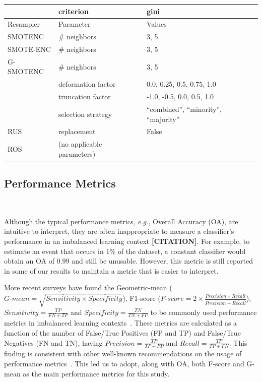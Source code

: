 \documentclass[parskip=full]{scrartcl}
\begin{document}
\begin{table}
\begin{tabular}{lll}
                        & criterion                        & gini                           \\
		\toprule
		Resampler       & Parameter                        & Values                         \\
		\midrule
		SMOTENC         & \# neighbors                     & 3, 5                           \\
		SMOTE-ENC       & \# neighbors                     & 3, 5                           \\
		G-SMOTENC       & \# neighbors                     & 3, 5                           \\
                        & deformation factor               & 0.0, 0.25, 0.5, 0.75, 1.0      \\
                        & truncation factor                & -1.0, -0.5, 0.0, 0.5, 1.0      \\
                        & selection strategy               & ``combined'',
                        ``minority'', ``majority''\\
		RUS             & replacement                      & False                          \\
		ROS             & (no applicable parameters)       &                                \\
		\bottomrule
	\end{tabular}
\end{table}

\subsection{Performance Metrics}~\label{sec:performance_metrics}

Although the typical performance metrics, \textit{e.g.}, Overall Accuracy
(OA), are intuitive to interpret, they are often inappropriate to measure a
classifier's performance in an imbalanced learning context
\textbf{[CITATION]}. For example, to estimate an event that occurs in 1\% of
the dataset, a constant classifier would obtain an OA of 0.99 and still be
unusable. However, this metric is still reported in some of our results to
maintain a metric that is easier to interpret.

More recent surveys have found the Geometric-mean ($\textit{G-mean} =
\sqrt{\overline{Sensitivity} \times \overline{Specificity}}$), F1-score
($\textit{F-score}=2\times\frac{\overline{Precision} \times
\overline{Recall}}{\overline{Precision} + \overline{Recall}}$), $Sensitivity =
\frac{TP}{FN+TP}$ and $Specificity = \frac{TN}{TN + FP}$ to be commonly used
performance metrics in imbalanced learning contexts~\cite{rout2018handling}.
These metrics are calculated as a function of the number of False/True
Positives (FP and TP) and False/True Negatives (FN and TN), having
$Precision = \frac{TP}{TP+FP}$ and $Recall = \frac{TP}{TP+FN}$.
This finding is consistent with other well-known recommendations on the usage
of performance metrics~\cite{jeni2013facing}. This led us to adopt, along with
OA, both F-score and G-mean as the main performance metrics for this study. 
\end{document}
